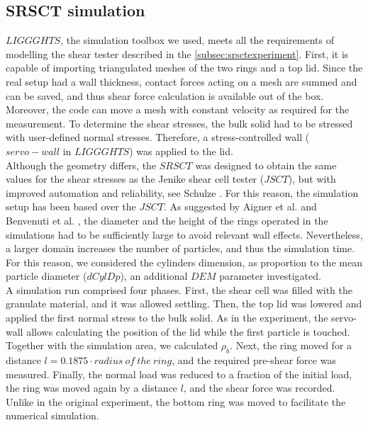 \begin{appendix}
\subsection{SRSCT simulation}
\label{subsec:srsctsimulation}
$LIGGGHTS$, the simulation toolbox we used, meets all the requirements of
modelling the shear tester described in the \ref{subsec:srsctexperiment}. 
First, it is capable of importing triangulated meshes of the two rings and a top lid. 
Since the real setup had a wall thickness, contact forces acting on a mesh are summed and can be saved, 
and thus shear force calculation is available out of the box. Moreover, the code can move a mesh with constant 
velocity as required for the measurement. To determine the shear stresses, the bulk solid had to be stressed with 
user-defined normal stresses. Therefore, a stress-controlled wall ($servo-wall$ in $LIGGGHTS$) was applied to the lid. \\
Although the geometry differs, the $SRSCT$ was designed to obtain the same values for the shear stresses as the 
Jenike shear cell tester ($JSCT$), but with improved automation and reliability,
see Schulze \cite{RefWorks:118}. 
For this reason, the simulation setup has been
based over the $JSCT$.
As suggested by Aigner et al. \cite{RefWorks:139} and Benvenuti et al. \cite{RefWorks:173}, 
the diameter and the height of the rings operated in the simulations had to be sufficiently large to avoid relevant wall effects. 
Nevertheless, a larger domain increases the number of particles, and thus the simulation time. 
For this reason, we considered the cylinders dimension, as proportion to the mean particle diameter ($dCylDp$), 
an additional $DEM$ parameter investigated. \\   
%  
A simulation run comprised four phases. 
First, the shear cell was filled with the granulate material, and it was allowed
settling.
Then, the top lid was lowered and applied the first normal stress to the bulk solid. 
As in the experiment, the servo-wall allows calculating the position of the lid
while the first particle is touched. 
Together with the simulation area, we calculated $\rho_b$. 
Next, the ring moved for a distance $l=0.1875 \cdot radius ~of ~the ~ring$, and the required pre-shear force was measured. 
Finally, the normal load was reduced to a fraction of the initial load, 
the ring was moved again by a distance $l$, and the shear force was recorded. 
Unlike in the original experiment, the bottom ring was moved to facilitate the numerical simulation. 

\end{appendix}

